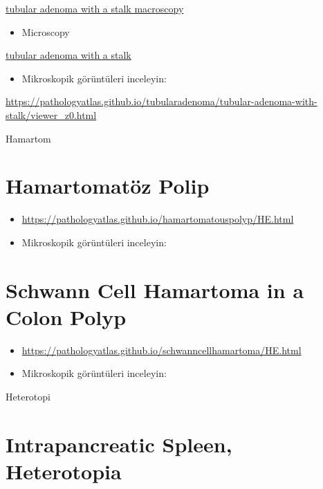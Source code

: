 \documentclass[
  letterpaper,
  DIV=11,
  numbers=noendperiod]{scrreprt}
\providecommand{\tightlist}{%
  \setlength{\itemsep}{0pt}\setlength{\parskip}{0pt}}
\begin{document}
\href{https://pathologyatlas.github.io/tubularadenoma/tubular-adenoma-with-stalk-macroscopy.jpg}{tubular
adenoma with a stalk macroscopy}

\begin{itemize}
\tightlist
\item
  Microscopy
\end{itemize}

\href{https://pathologyatlas.github.io/tubularadenoma/tubular-adenoma-with-stalk.jpeg}{tubular
adenoma with a stalk}

\begin{itemize}
\tightlist
\item
  Mikroskopik görüntüleri inceleyin:
\end{itemize}

\url{https://pathologyatlas.github.io/tubularadenoma/tubular-adenoma-with-stalk/viewer_z0.html}

Hamartom

\hypertarget{hamartomatuxf6z-polip}{%
\chapter{Hamartomatöz Polip}\label{hamartomatuxf6z-polip}}

\begin{itemize}
\item
  \url{https://pathologyatlas.github.io/hamartomatouspolyp/HE.html}
\item
  Mikroskopik görüntüleri inceleyin:
\end{itemize}

\hypertarget{schwann-cell-hamartoma-in-a-colon-polyp}{%
\chapter{Schwann Cell Hamartoma in a Colon
Polyp}\label{schwann-cell-hamartoma-in-a-colon-polyp}}

\begin{itemize}
\item
  \url{https://pathologyatlas.github.io/schwanncellhamartoma/HE.html}
\item
  Mikroskopik görüntüleri inceleyin:
\end{itemize}

Heterotopi

\hypertarget{intrapancreatic-spleen-heterotopia}{%
\chapter{Intrapancreatic Spleen,
Heterotopia}\label{intrapancreatic-spleen-heterotopia}}
\end{document}

